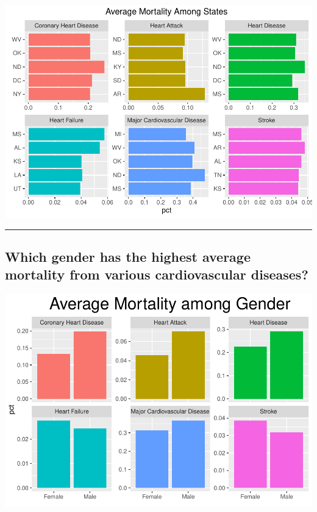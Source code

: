 \documentclass[]{article}
\begin{document}
\includegraphics{final_project_files/figure-latex/StateMortality-1.pdf}

\begin{center}\rule{0.5\linewidth}{\linethickness}\end{center}

\hypertarget{which-gender-has-the-highest-average-mortality-from-various-cardiovascular-diseases}{%
\subsection{Which gender has the highest average mortality from various
cardiovascular
diseases?}\label{which-gender-has-the-highest-average-mortality-from-various-cardiovascular-diseases}}

\includegraphics{final_project_files/figure-latex/GenderMortality-1.pdf}
\end{document}
